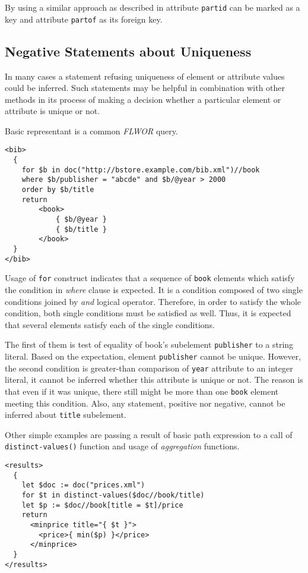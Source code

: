 By using a similar approach as described in \cite{Necasky:2009:DXK:1529282.1529414} attribute \texttt{partid} can be marked as a key and attribute \texttt{partof} as its foreign key.

\subsection{Negative Statements about Uniqueness} \label{Negative_uniqueness}
In many cases a statement refusing uniqueness of element or attribute values could be inferred. Such statements may be helpful in combination with other methods in its process of making a decision whether a particular element or attribute is unique or not.

Basic representant is a common \emph{FLWOR} query.

\begin{verbatim}
<bib>
  {
    for $b in doc("http://bstore.example.com/bib.xml")//book
    where $b/publisher = "abcde" and $b/@year > 2000
    order by $b/title
    return
        <book>
            { $b/@year }
            { $b/title }
        </book>
  }
</bib>
\end{verbatim}

Usage of \texttt{for} construct indicates that a sequence of \texttt{book} elements which satisfy the condition in \emph{where} clause is expected. It is a condition composed of two single conditions joined by \emph{and} logical operator. Therefore, in order to satisfy the whole condition, both single conditions must be satisfied as well. Thus, it is expected that several elements satisfy each of the single conditions.

The first of them is test of equality of book's subelement \texttt{publisher} to a string literal. Based on the expectation, element \texttt{publisher} cannot be unique. However, the second condition is greater-than comparison of \texttt{year} attribute to an integer literal, it cannot be inferred whether this attribute is unique or not. The reason is that even if it was unique, there still might be more than one \texttt{book} element meeting this condition. Also, any statement, positive nor negative, cannot be inferred about \texttt{title} subelement.

Other simple examples are passing a result of basic path expression to a call of \texttt{distinct-values()} function and usage of \emph{aggregation} functions.

\begin{verbatim}
<results>
  {
    let $doc := doc("prices.xml")
    for $t in distinct-values($doc//book/title)
    let $p := $doc//book[title = $t]/price
    return
      <minprice title="{ $t }">
        <price>{ min($p) }</price>
      </minprice>
  }
</results>
\end{verbatim}

